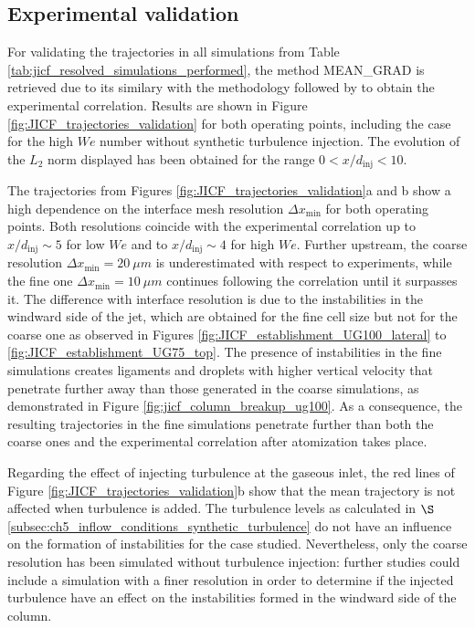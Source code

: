 \subsection{Experimental validation}

For validating the trajectories in all simulations from Table \ref{tab:jicf_resolved_simulations_performed}, the method MEAN\_GRAD is retrieved due to its similary with the methodology followed by  to obtain the experimental correlation. Results are shown in Figure \ref{fig:JICF_trajectories_validation} for both operating points, including the case for the high $We$ number without synthetic turbulence injection. The evolution of the $L_2$ norm displayed has been obtained for the range $0 < x/d_\mathrm{inj} < 10$.

The trajectories from Figures \ref{fig:JICF_trajectories_validation}a and b show a high dependence on the interface mesh resolution $\Delta x_\mathrm{min}$ for both operating points. Both resolutions coincide with the experimental correlation up to $x/d_\mathrm{inj} \sim 5$ for low $We$ and to $x/d_\mathrm{inj} \sim 4$ for high $We$. Further upstream, the coarse resolution $\Delta x_\mathrm{min} = 20~\mu m$ is underestimated with respect to experiments, while the fine one $\Delta x_\mathrm{min} = 10~\mu m$ continues following the correlation until it surpasses it. The difference with interface resolution is due to the instabilities in the windward side of the jet, which are obtained for the fine cell size but not for the coarse one as observed in Figures \ref{fig:JICF_establishment_UG100_lateral} to \ref{fig:JICF_establishment_UG75_top}. The presence of instabilities in the fine simulations creates ligaments and droplets with higher vertical velocity that penetrate further away than those generated in the coarse simulations, as demonstrated in Figure \ref{fig:jicf_column_breakup_ug100}. As a consequence, the resulting trajectories in the fine simulations penetrate further than both the coarse ones and the experimental correlation after atomization takes place. 


Regarding the effect of injecting turbulence at the gaseous inlet, the red lines of Figure \ref{fig:JICF_trajectories_validation}b show that the mean trajectory is not affected when turbulence is added. The turbulence levels as calculated in $\S$\ref{subsec:ch5_inflow_conditions_synthetic_turbulence} do not have an influence on the formation of instabilities for the case studied. Nevertheless, only the coarse resolution has been simulated without turbulence injection: further studies could include a simulation with a finer resolution in order to determine if the injected turbulence have an effect on the instabilities formed in the windward side of the column.

